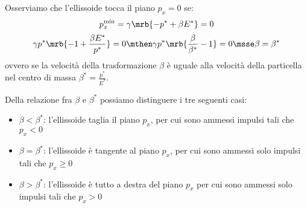 Osserviamo che l'ellissoide tocca il piano $p_x = 0$ se:
\begin{equation}
	p_{x}^{\text{min}} = \gamma\mrb{-p^\ast + \beta E^\ast} = 0
\end{equation}
\begin{equation}
	\gamma p^\ast\mrb{- 1 + \frac{\beta E^\ast}{p^\ast}} = 0
	\mthen
	\gamma p^\ast\mrb{\frac{\beta}{\beta^\ast} - 1} = 0
	\msse
	\beta = \beta^\ast
\end{equation}
ovvero se la velocità della trasformazione $\beta$ è uguale alla velocità della
particella nel centro di massa $\beta^\ast = \frac{p^\ast}{E^\ast}$.

Della relazione fra $\beta$ e $\beta^\ast$ possiamo distinguere i tre seguenti
casi:
\begin{itemize}
	\item $\beta < \beta^\ast$: l'ellissoide taglia il piano $p_x$, per cui sono
	      ammessi impulsi tali che $p_x < 0$
	\item $\beta = \beta^\ast$: l'ellissoide è tangente al piano $p_x$, per cui
	      sono ammessi solo impulsi tali che $p_x \geq 0$
	\item $\beta > \beta^\ast$: l'ellissoide è tutto a destra del piano $p_x$ per
	      cui sono ammessi solo impulsi tali che $p_x > 0$
\end{itemize}
